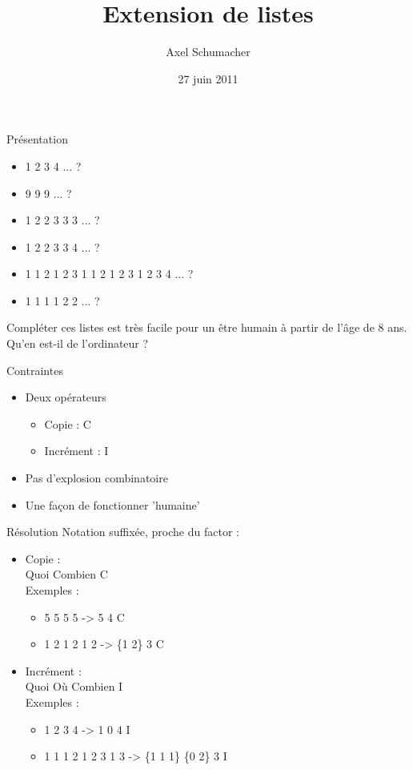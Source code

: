 \documentclass{beamer}
\title[PLNC]{Extension de listes}
\author{Axel Schumacher}
\institute{Télécom Paristech}
\date{27 juin 2011}
\begin{document}
\begin{frame}
  \titlepage
\end{frame}

\begin{frame}{Présentation}
  \begin{itemize}
    \item{1 2 3 4 ... ?}
    \item{9 9 9 ... ?}
    \item{1 2 2 3 3 3 ... ?}
    \item{1 2 2 3 3 4 ... ?}
    \item{1 1 2 1 2 3 1 1 2 1 2 3 1 2 3 4 ... ?}
    \item{1 1 1 1 2 2 ... ? }
  \end{itemize}
  \begin{center}
  Compléter ces listes est très facile pour un être humain à partir de l'âge de 8 ans.\\
  Qu'en est-il de l'ordinateur ?
  \end{center}
\end{frame}

\begin{frame}{Contraintes}
  \begin{itemize}
    \item{
      Deux opérateurs
      \begin{itemize}
        \item{Copie : C}
        \item{Incrément : I}
      \end{itemize}}
    \item{Pas d'explosion combinatoire}
    \item{Une façon de fonctionner 'humaine'}
  \end{itemize}
\end{frame}

\begin{frame}{Résolution}
  Notation suffixée, proche du factor :\\
  \begin{itemize}
    \item{
      Copie :\\
      Quoi Combien C\\
      Exemples :
      \begin{itemize}
        \item{5 5 5 5 -> 5 4 C}
        \item{1 2 1 2 1 2 -> \{1 2\} 3 C}
      \end{itemize}}
    \item{
      Incrément :\\
      Quoi Où Combien I\\
      Exemples :
      \begin{itemize}
        \item{1 2 3 4 -> 1 0 4 I}
        \item{1 1 1 2 1 2 3 1 3 -> \{1 1 1\} \{0 2\} 3 I}
      \end{itemize}}
  \end{itemize}
\end{frame}
\end{document}
